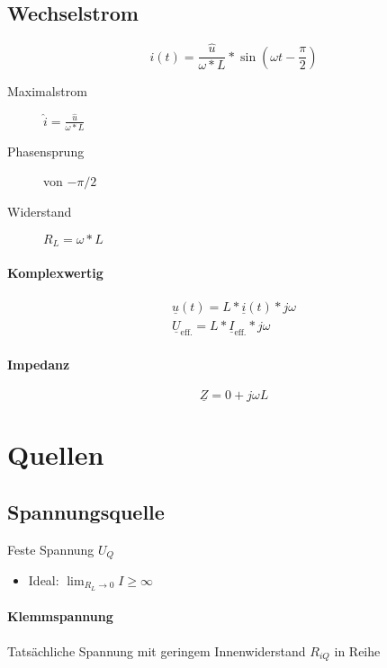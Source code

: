 \subsection{Wechselstrom}

$$i(t) = \frac{\hat{u}}{\omega * L} * \sin (\omega t - \frac{\pi}{2})$$

\begin{description}
  \item[Maximalstrom] $\hat{i} = \frac{\hat{u}}{\omega * L}$
  \item[Phasensprung] von $-\pi/2$
  \item[Widerstand] $R_L = \omega * L$
\end{description}

\paragraph{Komplexwertig}

\begin{gather*}
  \underline{u}(t) = L * \underline{i}(t) * j\omega \\
  \underline{U}_\text{eff.} = L * \underline{I}_\text{eff.} * j\omega
\end{gather*}

\paragraph{Impedanz}

$$\underline{Z} = 0 + j \omega L$$

\section{Quellen}

\subsection{Spannungsquelle}

Feste Spannung $U_Q$

\begin{itemize}
  \item Ideal: $\lim_{R_L \rightarrow 0} I \geq \infty$
\end{itemize}

\paragraph{Klemmspannung} Tatsächliche Spannung mit geringem Innenwiderstand $R_{iQ}$ in Reihe


